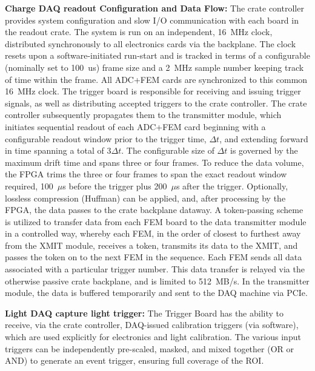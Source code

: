\noindent\textbf{Charge DAQ readout Configuration and Data Flow:} The crate controller provides system configuration and slow I/O communication with each board in the readout crate. The system is run on an independent, 16~MHz clock, distributed synchronously to all electronics cards via the backplane. The clock resets upon a software-initiated run-start and is tracked in terms of a configurable (nominally set to 100~us) frame size and a 2~MHz sample number keeping track of time within the frame. All ADC+FEM cards are synchronized to this common 16~MHz clock. The trigger board is responsible for receiving and issuing trigger signals, as well as distributing accepted triggers to the crate controller. The crate controller subsequently propagates them to the transmitter module, which initiates sequential readout of each ADC+FEM card beginning with a configurable readout window prior to the trigger time, $\Delta t$, and extending forward in time spanning a total of 3$\Delta t$. The configurable size of $\Delta t$ is governed by the maximum drift time and spans three or four frames. To reduce the data volume, the FPGA trims the three or four frames to span the exact readout window required, 100~$\mu$s before the trigger plus 200~$\mu$s after the trigger. Optionally, lossless compression (Huffman) can be applied, and, after processing by the FPGA, the data passes to the crate backplane dataway. A token-passing scheme is utilized to transfer data from each FEM board to the data transmitter module in a controlled way, whereby each FEM, in the order of closest to furthest away from the XMIT module, receives a token, transmits its data to the XMIT, and passes the token on to the next FEM in the sequence. Each FEM sends all data associated with a particular trigger number. This data transfer is relayed via the otherwise passive crate backplane, and is limited to 512~MB/s. In the transmitter module, the data is buffered temporarily and sent to the DAQ machine via PCIe.

\noindent\textbf{Light DAQ capture light trigger:} The Trigger Board has the ability to receive, via the crate controller, DAQ-issued calibration triggers (via software), which are used explicitly for electronics and light calibration. The various input triggers can be independently pre-scaled, masked, and mixed together (OR or AND) to generate an event trigger, ensuring full coverage of the \ac{ROI}.

